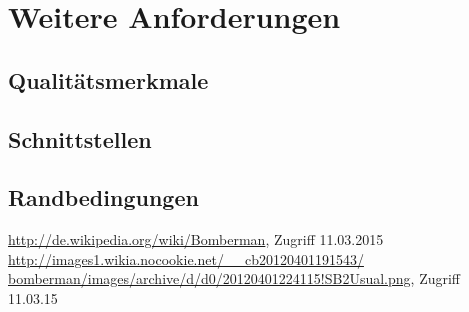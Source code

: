 \documentclass[11pt]{scrartcl}
\begin{document}
\section{Weitere Anforderungen}
\label{sec:Weitere Anforderungen}

\subsection{Qualitätsmerkmale}
\label{sec:Qualitätsmermale}

\subsection{Schnittstellen}
\label{sec:Schnittstellen}

\subsection{Randbedingungen}
\label{sec:Randbedingungen}


\begin{thebibliography}{999}
\url{http://de.wikipedia.org/wiki/Bomberman}, Zugriff 
11.03.2015
\url{http://images1.wikia.nocookie.net/__cb20120401191543/
bomberman/images/archive/d/d0/20120401224115!SB2Usual.png}, Zugriff 11.03.15
\end{thebibliography}
\end{document}

